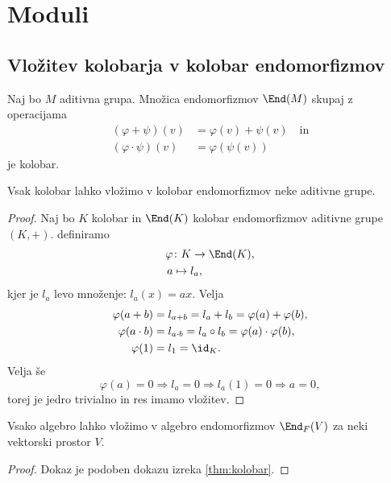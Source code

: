 \section{Moduli}
\subsection{Vložitev kolobarja v kolobar endomorfizmov}

Naj bo $M$ aditivna grupa. Množica endomorfizmov $\End(M)$ skupaj z operacijama
\begin{align*}
    (\varphi + \psi)(v) &= \varphi(v) + \psi(v) \quad \text{in} \\
    (\varphi \cdot \psi)(v) &= \varphi(\psi(v))
\end{align*}
je kolobar.

\begin{izrek}
    Vsak kolobar lahko vložimo v kolobar endomorfizmov neke aditivne grupe.
    \label{thm:kolobar}
\end{izrek}

\begin{proof}
    Naj bo $K$ kolobar in $\End(K)$ kolobar endomorfizmov aditivne grupe $(K, +)$. definiramo
    \begin{align*}
        \varphi &\colon K \to \End(K), \\
        a &\mapsto l_a,
    \end{align*}
    kjer je $l_a$ levo množenje: $l_a(x) = ax$. Velja
    \begin{align*}
        \varphi(a+b) &= l_{a+b} = l_a + l_b = \varphi(a) + \varphi(b), \\
        \varphi(a\cdot b) &= l_{a \cdot b} = l_a \circ l_b = \varphi(a) \cdot \varphi(b), \\
        \varphi(1) &= l_1 = \id_K.
    \end{align*}
    Velja še
    \[
        \varphi(a) = 0 \Rightarrow l_a = 0 \Rightarrow l_a(1) = 0 \Rightarrow a = 0,
    \]
    torej je jedro trivialno in res imamo vložitev.
\end{proof}

\begin{izrek}
    Vsako algebro lahko vložimo v algebro endomorfizmov $\End_F(V)$ za neki 
    vektorski prostor $V$.
\end{izrek}

\begin{proof}
    Dokaz je podoben dokazu izreka \ref{thm:kolobar}.
\end{proof}

